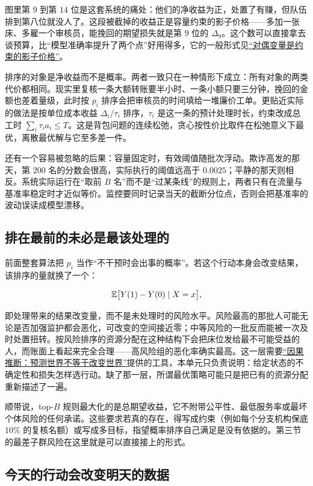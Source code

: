 图里第 \(9\) 到第 \(14\) 位是这套系统的痛处：他们的净收益为正，处置了有赚，但队伍排到第八位就没人了。这段被截掉的收益正是容量约束的影子价格——多加一张床、多雇一个审核员，能挽回的期望损失就是第 \(9\) 位的 \(\Delta_9\)。这个数可以直接拿去谈预算，比``模型准确率提升了两个点''好用得多，它的一般形式见\hyperref[sec:09-Convex-Optimization/05-Duality/04]{``对偶变量是约束的影子价格''}。

排序的对象是净收益而不是概率。两者一致只在一种情形下成立：所有对象的两类代价都相同。现实里复核一条大额转账要半小时、一条小额只要三分钟，挽回的金额也差着量级，此时按 \(p_i\) 排序会把审核员的时间填给一堆廉价工单。更贴近实际的做法是按单位成本收益 \(\Delta_i/\tau_i\) 排序，\(\tau_i\) 是这一条的预计处理时长，约束改成总工时 \(\sum_i \tau_i a_i\le T\)。这是背包问题的连续松弛，贪心按性价比取件在松弛意义下最优，离散最优解与它至多差一件。

还有一个容易被忽略的后果：容量固定时，有效阈值随批次浮动。欺诈高发的那天，第 \(200\) 名的分数会很高，实际执行的阈值远高于 \(0.0025\)；平静的那天则相反。系统实际运行在``取前 \(B\) 名''而不是``过某条线''的规则上，两者只有在流量与基准率稳定时才近似等价。监控要同时记录当天的截断分位点，否则会把基准率的波动误读成模型漂移。

\subsection{排在最前的未必是最该处理的}

前面整套算法把 \(p_i\) 当作``不干预时会出事的概率''。若这个行动本身会改变结果，该排序的量就换了一个：

\[
\mathbb{E}\bigl[Y(1)-Y(0)\mid X=x\bigr],
\]

即处理带来的结果改变量，而不是未处理时的风险水平。风险最高的那批人可能无论是否加强监护都会恶化，可改变的空间接近零；中等风险的一批反而能被一次及时处置扭转。按风险排序的资源分配在这种结构下会把床位发给最不可能受益的人，而账面上看起来完全合理——高风险组的恶化率确实最高。这一层需要\hyperref[ch:120]{``因果推断：预测世界不等于改变世界''}提供的工具，本单元只负责说明：给定状态的不确定性和损失怎样选行动。缺了那一层，所谓最优策略可能只是把已有的资源分配重新描述了一遍。

顺带说，top-\(B\) 规则最大化的是总期望收益，它不附带公平性、最低服务率或最坏个体风险的任何承诺。这些要求若真的存在，得写成约束（例如每个分支机构保底 \(10\%\) 的复核名额）或写成多目标，指望概率排序自己满足是没有依据的。第三节的最差子群风险在这里就是可以直接接上的形式。

\subsection{今天的行动会改变明天的数据}

